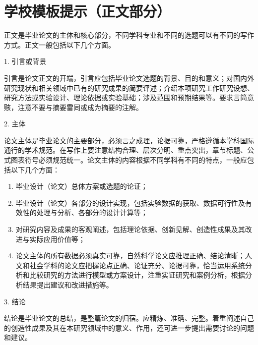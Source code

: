 \chapter{学校模板提示（正文部分）}

正文是毕业论文的主体和核心部分，不同学科专业和不同的选题可以有不同的写作方式。正文一般包括以下几个方面。

1. 引言或背景

引言是论文正文的开端，引言应包括毕业论文选题的背景、目的和意义；对国内外研究现状和相关领域中已有的研究成果的简要评述；介绍本项研究工作研究设想、研究方法或实验设计、理论依据或实验基础；涉及范围和预期结果等。要求言简意赅，注意不要与摘要雷同或成为摘要的注解。

2. 主体

论文主体是毕业论文的主要部分，必须言之成理，论据可靠，严格遵循本学科国际通行的学术规范。在写作上要注意结构合理、层次分明、重点突出，章节标题、公式图表符号必须规范统一。论文主体的内容根据不同学科有不同的特点，一般应包括以下几个方面：

\begin{enumerate}[(1)]
    \item 毕业设计（论文）总体方案或选题的论证；
    \item 毕业设计（论文）各部分的设计实现，包括实验数据的获取、数据可行性及有效性的处理与分析、各部分的设计计算等；
    \item 对研究内容及成果的客观阐述，包括理论依据、创新见解、创造性成果及其改进与实际应用价值等；
    \item 论文主体的所有数据必须真实可靠，自然科学论文应推理正确、结论清晰；人文和社会学科的论文应把握论点正确、论证充分、论据可靠，恰当运用系统分析和比较研究的方法进行模型或方案设计，注重实证研究和案例分析，根据分析结果提出建议和改进措施等。
\end{enumerate}


3. 结论

结论是毕业论文的总结，是整篇论文的归宿。应精炼、准确、完整。着重阐述自己的创造性成果及其在本研究领域中的意义、作用，还可进一步提出需要讨论的问题和建议。

